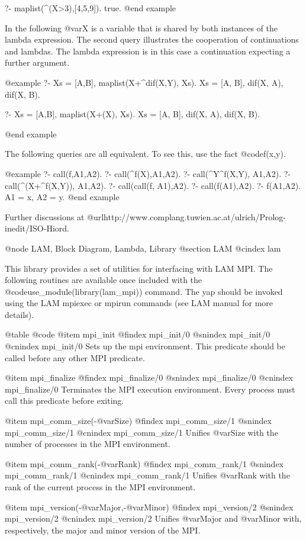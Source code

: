 {{{{{{{{{?- maplist(\X^(X>3),[4,5,9]).
true.
@end example

In the following @var{X} is a variable that is shared by both instances
of the lambda expression. The second query illustrates the cooperation
of continuations and lambdas. The lambda expression is in this case a
continuation expecting a further argument.

@example
?- Xs = [A,B], maplist(X+\Y^dif(X,Y), Xs).
Xs = [A, B],
dif(X, A),
dif(X, B).

?- Xs = [A,B], maplist(X+\dif(X), Xs).
Xs = [A, B],
dif(X, A),
dif(X, B).

@end example

The following queries are all equivalent. To see this, use
the fact @code{f(x,y)}.

@example
?- call(f,A1,A2).
?- call(\X^f(X),A1,A2).
?- call(\X^Y^f(X,Y), A1,A2).
?- call(\X^(X+\Y^f(X,Y)), A1,A2).
?- call(call(f, A1),A2).
?- call(f(A1),A2).
?- f(A1,A2).
A1 = x,
A2 = y.
@end example

Further discussions
at @url{http://www.complang.tuwien.ac.at/ulrich/Prolog-inedit/ISO-Hiord}.


@node LAM, Block Diagram, Lambda, Library
@section LAM
@cindex lam

This library provides a set of utilities for interfacing with LAM MPI.
The following routines are available once included with the
@code{use_module(library(lam_mpi))} command. The yap should be
invoked using the LAM mpiexec or mpirun commands (see LAM manual for
more details).

@table @code
@item mpi_init
@findex mpi_init/0
@snindex mpi_init/0
@cnindex mpi_init/0
      Sets up the mpi environment. This predicate should be called before any other MPI predicate.

@item mpi_finalize
@findex mpi_finalize/0
@snindex mpi_finalize/0
@cnindex mpi_finalize/0
      Terminates the MPI execution environment. Every process must call this predicate before  exiting.

@item mpi_comm_size(-@var{Size})
@findex mpi_comm_size/1
@snindex mpi_comm_size/1
@cnindex mpi_comm_size/1
      Unifies @var{Size} with the number of processes in the MPI environment.


@item mpi_comm_rank(-@var{Rank})
@findex mpi_comm_rank/1
@snindex mpi_comm_rank/1
@cnindex mpi_comm_rank/1
      Unifies @var{Rank} with the rank of the current process in the MPI environment.

@item mpi_version(-@var{Major},-@var{Minor})
@findex mpi_version/2
@snindex mpi_version/2
@cnindex mpi_version/2
      Unifies @var{Major} and @var{Minor} with, respectively, the major and minor version of the MPI.


}}}}}}}}}
